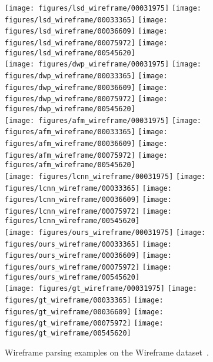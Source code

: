 \documentclass[10pt,twocolumn,letterpaper]{article}
\begin{document}
\begin{figure*}
    \def\outsize{0.138\linewidth}
    \centering
    \texttt{[image: figures/lsd\_wireframe/00031975]}
    \texttt{[image: figures/lsd\_wireframe/00033365]}
    \texttt{[image: figures/lsd\_wireframe/00036609]}
    \texttt{[image: figures/lsd\_wireframe/00075972]}
    \texttt{[image: figures/lsd\_wireframe/00545620]} \\
    \texttt{[image: figures/dwp\_wireframe/00031975]}
    \texttt{[image: figures/dwp\_wireframe/00033365]}
    \texttt{[image: figures/dwp\_wireframe/00036609]}
    \texttt{[image: figures/dwp\_wireframe/00075972]}
    \texttt{[image: figures/dwp\_wireframe/00545620]} \\
    \texttt{[image: figures/afm\_wireframe/00031975]}
    \texttt{[image: figures/afm\_wireframe/00033365]}
    \texttt{[image: figures/afm\_wireframe/00036609]}
    \texttt{[image: figures/afm\_wireframe/00075972]}
    \texttt{[image: figures/afm\_wireframe/00545620]} \\
    \texttt{[image: figures/lcnn\_wireframe/00031975]}
    \texttt{[image: figures/lcnn\_wireframe/00033365]}
    \texttt{[image: figures/lcnn\_wireframe/00036609]}
    \texttt{[image: figures/lcnn\_wireframe/00075972]}
    \texttt{[image: figures/lcnn\_wireframe/00545620]} \\
    \hspace{-1.8pt}
    \texttt{[image: figures/ours\_wireframe/00031975]}
    \texttt{[image: figures/ours\_wireframe/00033365]}
    \texttt{[image: figures/ours\_wireframe/00036609]}
    \texttt{[image: figures/ours\_wireframe/00075972]}
    \texttt{[image: figures/ours\_wireframe/00545620]} \\
    \texttt{[image: figures/gt\_wireframe/00031975]}
    \texttt{[image: figures/gt\_wireframe/00033365]}
    \texttt{[image: figures/gt\_wireframe/00036609]}
    \texttt{[image: figures/gt\_wireframe/00075972]}
    \texttt{[image: figures/gt\_wireframe/00545620]}
    \caption{Wireframe parsing examples on the Wireframe dataset~\cite{Huang2018a}. }
    \vspace{-4mm}
    \label{fig:visualization-wireframe}
\end{figure*}
\end{document}
